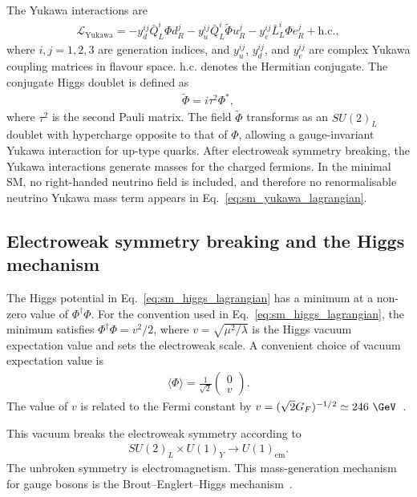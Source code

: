 The Yukawa interactions are
\begin{align}
    \mathcal{L}_{\mathrm{Yukawa}}
    =
    -
    y_{d}^{ij}\bar{Q}_{L}^{i}\Phi d_{R}^{j}
    -
    y_{u}^{ij}\bar{Q}_{L}^{i}\tilde{\Phi} u_{R}^{j}
    -
    y_{e}^{ij}\bar{L}_{L}^{i}\Phi e_{R}^{j}
    +
    \mathrm{h.c.},
    \label{eq:sm_yukawa_lagrangian}
\end{align}
where $i,j=1,2,3$ are generation indices, and $y_{u}^{ij}$, $y_{d}^{ij}$, and $y_{e}^{ij}$ are complex Yukawa coupling matrices in flavour space. 
$\mathrm{h.c.}$ denotes the Hermitian conjugate. 
The conjugate Higgs doublet is defined as
\begin{align}
    \tilde{\Phi}
    =
    i\tau^{2}\Phi^{*},
    \label{eq:higgs_conjugate_doublet}
\end{align}
where $\tau^{2}$ is the second Pauli matrix. 
The field $\tilde{\Phi}$ transforms as an $SU(2)_{L}$ doublet with hypercharge opposite to that of $\Phi$, allowing a gauge-invariant Yukawa interaction for up-type quarks. 
After electroweak symmetry breaking, the Yukawa interactions generate masses for the charged fermions. 
In the minimal SM, no right-handed neutrino field is included, and therefore no renormalisable neutrino Yukawa mass term appears in Eq.~\eqref{eq:sm_yukawa_lagrangian}.

\subsection{Electroweak symmetry breaking and the Higgs mechanism}
\label{subsec:ewsb}

The Higgs potential in Eq.~\eqref{eq:sm_higgs_lagrangian} has a minimum at a non-zero value of $\Phi^{\dagger}\Phi$. 
For the convention used in Eq.~\eqref{eq:sm_higgs_lagrangian}, the minimum satisfies $\Phi^{\dagger}\Phi=v^{2}/2$, where $v=\sqrt{\mu^{2}/\lambda}$ is the Higgs vacuum expectation value and sets the electroweak scale. 
A convenient choice of vacuum expectation value is
\begin{align}
    \langle\Phi\rangle
    =
    \frac{1}{\sqrt{2}}
    \begin{pmatrix}
        0 \\
        v
    \end{pmatrix}.
    \label{eq:higgs_vev}
\end{align}
The value of $v$ is related to the Fermi constant by $v=(\sqrt{2}G_{F})^{-1/2}\simeq 246~\GeV$~\cite{PDG2025}.

This vacuum breaks the electroweak symmetry according to
\begin{align}
    SU(2)_{L}\times U(1)_{Y}
    \rightarrow
    U(1)_{\mathrm{em}}.
    \label{eq:ewsb_breaking_pattern}
\end{align}
The unbroken symmetry is electromagnetism. 
This mass-generation mechanism for gauge bosons is the Brout--Englert--Higgs mechanism~\cite{EnglertBrout1964,Higgs1964,GuralnikHagenKibble1964}.

